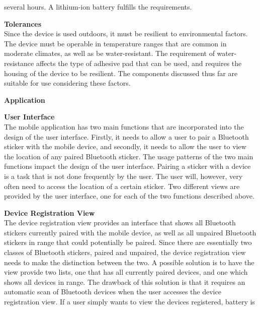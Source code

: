 \documentclass[12pt]{article}
\begin{document}
\begin{packed_enum}
\begin{packed_enum}
\begin{packed_enum}
        several hours. A lithium-ion battery fulfills the requirements.
      \end{packed_enum}
      \item \textbf{Tolerances} \\
      Since the device is used outdoors, it must be resilient to environmental factors. The device must be
      operable in temperature ranges that are common in moderate climates, as well as be water-resistant. The
      requirement of water-resistance affects the type of adhesive pad that can be used, and requires the
      housing of the device to be resilient. The components discussed thus far are suitable for use considering
      these factors.
    \end{packed_enum}
    \item \textbf{Application}
    \begin{packed_enum}
      \item \textbf{User Interface} \\
      The mobile application has two main functions that are incorporated into the design of the user interface.
      Firstly, it needs to allow a user to pair a Bluetooth sticker with the mobile device, and secondly, it 
      needs to allow the user to view the location of any paired Bluetooth sticker. The usage patterns of the
      two main functions impact the design of the user interface. Pairing a sticker with a device is a task that
      is not done frequently by the user. The user will, however, very often need to access the location of a
      certain sticker. Two different views are provided by the user interface, one for each of the two functions
      described above.
      \begin{packed_enum}
        \item \textbf{Device Registration View} \\
        The device registration view provides an interface that shows all Bluetooth stickers currently paired
        with the mobile device, as well as all unpaired Bluetooth stickers in range that could potentially be
        paired. Since there are essentially two classes of Bluetooth stickers, paired and unpaired, the device
        registration view needs to make the distinction between the two. A possible solution is to have the view
        provide two lists, one that has all currently paired devices, and one which shows all devices in range.
        The drawback of this solution is that it requires an automatic scan of Bluetooth devices when the user
        accesses the device registration view. If a user simply wants to view the devices registered, battery is

\end{packed_enum}
\end{packed_enum}
\end{packed_enum}
\end{document}
